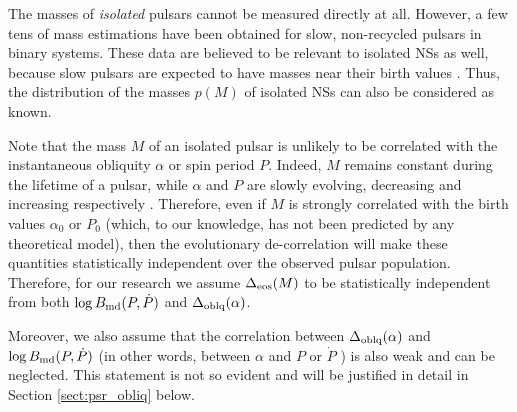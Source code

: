 \documentclass[fleqn,usenatbib]{mnras}
\begin{document}
The masses of {\it isolated} pulsars cannot be measured directly at
all. However, a few tens of mass estimations have been obtained
for slow, non-recycled pulsars in binary systems. These data are
believed to be relevant to isolated NSs as well, because slow pulsars
are expected to have masses near their birth values \citep[see the review by][and references therein, see also Section \ref{sect:psr_mass}]{ozel16}.
Thus, the distribution of the masses $p(M)$ of isolated NSs can also
be considered as known.

Note that the mass $M$ of an isolated pulsar is unlikely to be correlated with the instantaneous obliquity $\alpha$ or spin period $P$. Indeed, $M$
remains constant during the lifetime of a pulsar, while $\alpha$ and $P$ are
slowly evolving, decreasing and increasing respectively \citep{phil14}. Therefore, even if $M$ is strongly correlated with the birth
values $\alpha_0$ or $P_0$ (which, to our knowledge, has not been predicted
by any theoretical model), then the evolutionary de-correlation will
make these quantities statistically independent over the observed
pulsar population. Therefore, for our research we assume $\Delta_{\rm eos}(M)$ to
be statistically independent from both $\log B_{\rm md}(P, \dot
P)$ and $\Delta_{\rm oblq}(\alpha)$.

Moreover, we also assume that the correlation between $\Delta_{\rm oblq}(\alpha)$ and $\log B_{\rm md}(P, \dot P)$ (in other words, between $\alpha$ and $P$ or 
$\dot P$ ) is also weak and can be neglected. This statement is not so evident and
will be justified in detail in Section \ref{sect:psr_obliq} below.
\end{document}
